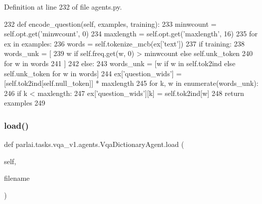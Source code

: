 Definition at line 232 of file agents.\+py.


\begin{DoxyCode}
232     \textcolor{keyword}{def }encode\_question(self, examples, training):
233         minwcount = self.opt.get(\textcolor{stringliteral}{'minwcount'}, 0)
234         maxlength = self.opt.get(\textcolor{stringliteral}{'maxlength'}, 16)
235         \textcolor{keywordflow}{for} ex \textcolor{keywordflow}{in} examples:
236             words = self.tokenize\_mcb(ex[\textcolor{stringliteral}{'text'}])
237             \textcolor{keywordflow}{if} training:
238                 words\_unk = [
239                     w \textcolor{keywordflow}{if} self.freq.get(w, 0) > minwcount \textcolor{keywordflow}{else} self.unk\_token
240                     \textcolor{keywordflow}{for} w \textcolor{keywordflow}{in} words
241                 ]
242             \textcolor{keywordflow}{else}:
243                 words\_unk = [w \textcolor{keywordflow}{if} w \textcolor{keywordflow}{in} self.tok2ind \textcolor{keywordflow}{else} self.unk\_token \textcolor{keywordflow}{for} w \textcolor{keywordflow}{in} words]
244             ex[\textcolor{stringliteral}{'question\_wids'}] = [self.tok2ind[self.null\_token]] * maxlength
245             \textcolor{keywordflow}{for} k, w \textcolor{keywordflow}{in} enumerate(words\_unk):
246                 \textcolor{keywordflow}{if} k < maxlength:
247                     ex[\textcolor{stringliteral}{'question\_wids'}][k] = self.tok2ind[w]
248         \textcolor{keywordflow}{return} examples
249 
\end{DoxyCode}
\mbox{\label{classparlai_1_1tasks_1_1vqa__v1_1_1agents_1_1VqaDictionaryAgent_ac84980d21c96740bb94d4215256937ac}} 
\subsubsection{\texorpdfstring{load()}{load()}}
{\footnotesize\ttfamily def parlai.\+tasks.\+vqa\+\_\+v1.\+agents.\+Vqa\+Dictionary\+Agent.\+load (\begin{DoxyParamCaption}\item[{}]{self,  }\item[{}]{filename }\end{DoxyParamCaption})}

